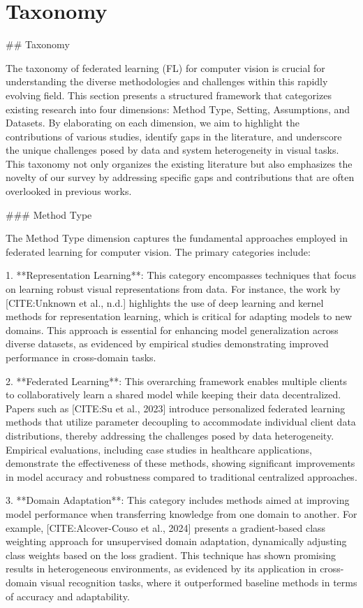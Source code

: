 \documentclass[journal]{IEEEtran}
\begin{document}
\section{Taxonomy}
\label{sec:taxonomy}

\#\# Taxonomy

The taxonomy of federated learning (FL) for computer vision is crucial for understanding the diverse methodologies and challenges within this rapidly evolving field. This section presents a structured framework that categorizes existing research into four dimensions: Method Type, Setting, Assumptions, and Datasets. By elaborating on each dimension, we aim to highlight the contributions of various studies, identify gaps in the literature, and underscore the unique challenges posed by data and system heterogeneity in visual tasks. This taxonomy not only organizes the existing literature but also emphasizes the novelty of our survey by addressing specific gaps and contributions that are often overlooked in previous works.

\#\#\# Method Type

The Method Type dimension captures the fundamental approaches employed in federated learning for computer vision. The primary categories include:

1. **Representation Learning**: This category encompasses techniques that focus on learning robust visual representations from data. For instance, the work by [CITE:Unknown et al., n.d.] highlights the use of deep learning and kernel methods for representation learning, which is critical for adapting models to new domains. This approach is essential for enhancing model generalization across diverse datasets, as evidenced by empirical studies demonstrating improved performance in cross-domain tasks.

2. **Federated Learning**: This overarching framework enables multiple clients to collaboratively learn a shared model while keeping their data decentralized. Papers such as [CITE:Su et al., 2023] introduce personalized federated learning methods that utilize parameter decoupling to accommodate individual client data distributions, thereby addressing the challenges posed by data heterogeneity. Empirical evaluations, including case studies in healthcare applications, demonstrate the effectiveness of these methods, showing significant improvements in model accuracy and robustness compared to traditional centralized approaches.

3. **Domain Adaptation**: This category includes methods aimed at improving model performance when transferring knowledge from one domain to another. For example, [CITE:Alcover-Couso et al., 2024] presents a gradient-based class weighting approach for unsupervised domain adaptation, dynamically adjusting class weights based on the loss gradient. This technique has shown promising results in heterogeneous environments, as evidenced by its application in cross-domain visual recognition tasks, where it outperformed baseline methods in terms of accuracy and adaptability.
\end{document}
